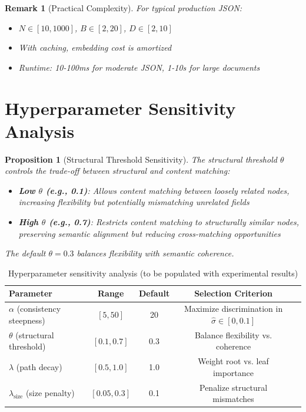 \documentclass{article}
\newtheorem{proposition}[theorem]{Proposition}
\newtheorem{remark}[theorem]{Remark}
\begin{document}
\begin{remark}[Practical Complexity]
For typical production JSON:
\begin{itemize}
    \item $N \in [10, 1000]$, $B \in [2, 20]$, $D \in [2, 10]$
    \item With caching, embedding cost is amortized
    \item Runtime: 10-100ms for moderate JSON, 1-10s for large documents
\end{itemize}
\end{remark}

\section{Hyperparameter Sensitivity Analysis}
\label{sec:ablation}

\begin{proposition}[Structural Threshold Sensitivity]
\label{prop:threshold}
The structural threshold $\theta$ controls the trade-off between structural and content matching:
\begin{itemize}
    \item \textbf{Low $\theta$ (e.g., 0.1)}: Allows content matching between loosely related nodes, increasing flexibility but potentially mismatching unrelated fields
    \item \textbf{High $\theta$ (e.g., 0.7)}: Restricts content matching to structurally similar nodes, preserving semantic alignment but reducing cross-matching opportunities
\end{itemize}
The default $\theta = 0.3$ balances flexibility with semantic coherence.
\end{proposition}

\begin{table}[h]
\centering
\caption{Hyperparameter sensitivity analysis (to be populated with experimental results)}
\label{tab:hyperparams}
\begin{tabular}{lcccc}
\toprule
Parameter & Range & Default & Selection Criterion \\
\midrule
$\alpha$ (consistency steepness) & $[5, 50]$ & 20 & Maximize discrimination in $\hat{\sigma} \in [0, 0.1]$ \\
$\theta$ (structural threshold) & $[0.1, 0.7]$ & 0.3 & Balance flexibility vs. coherence \\
$\lambda$ (path decay) & $[0.5, 1.0]$ & 1.0 & Weight root vs. leaf importance \\
$\lambda_{\text{size}}$ (size penalty) & $[0.05, 0.3]$ & 0.1 & Penalize structural mismatches \\
\bottomrule
\end{tabular}
\end{table}
\end{document}
